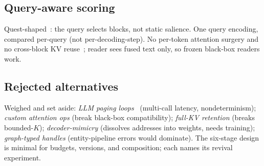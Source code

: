 \subsection{Query-aware scoring}
Quest-shaped~\cite{tang2024quest}: the query selects blocks, not static salience.
One query encoding, compared per-query (not per-decoding-step).
No per-token attention surgery and no cross-block KV reuse~\cite{yao2025cacheblend}; reader sees fused text only, so frozen black-box readers work.

\subsection{Rejected alternatives}
Weighed and set aside: \textit{LLM paging loops}~\cite{packer2023memgpt} (multi-call latency, nondeterminism); \textit{custom attention ops} (break black-box compatibility); \textit{full-KV retention} (breaks bounded-$K$); \textit{decoder-mimicry} \cite{cao2025memorydecoder} (dissolves addresses into weights, needs training); \textit{graph-typed handles} \cite{rasmussen2025zep} (entity-pipeline errors would dominate). The six-stage design is minimal for budgets, versions, and composition; each names its revival experiment.
